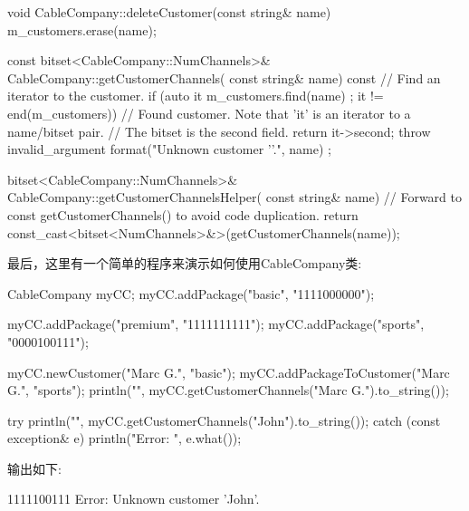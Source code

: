 \begin{cpp}
void CableCompany::deleteCustomer(const string& name)
{
    m_customers.erase(name);
}

const bitset<CableCompany::NumChannels>& CableCompany::getCustomerChannels(
    const string& name) const
{
    // Find an iterator to the customer.
    if (auto it { m_customers.find(name) }; it != end(m_customers)) {
        // Found customer. Note that 'it' is an iterator to a name/bitset pair.
        // The bitset is the second field.
        return it->second;
    }
    throw invalid_argument { format("Unknown customer '{}'.", name) };
}

bitset<CableCompany::NumChannels>& CableCompany::getCustomerChannelsHelper(
    const string& name)
{
    // Forward to const getCustomerChannels() to avoid code duplication.
    return const_cast<bitset<NumChannels>&>(getCustomerChannels(name));
}
\end{cpp}

最后，这里有一个简单的程序来演示如何使用CableCompany类:

\begin{cpp}
CableCompany myCC;
myCC.addPackage("basic", "1111000000");

myCC.addPackage("premium", "1111111111");
myCC.addPackage("sports", "0000100111");

myCC.newCustomer("Marc G.", "basic");
myCC.addPackageToCustomer("Marc G.", "sports");
println("{}", myCC.getCustomerChannels("Marc G.").to_string());

try { println("{}", myCC.getCustomerChannels("John").to_string()); }
catch (const exception& e) { println("Error: {}", e.what()); }
\end{cpp}

输出如下:

\begin{shell}
1111100111
Error: Unknown customer 'John'.
\end{shell}






